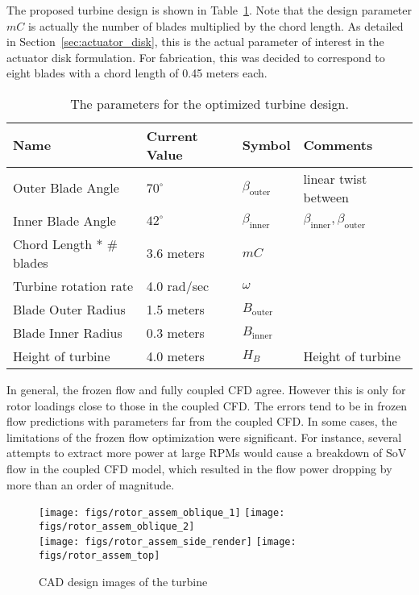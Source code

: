 The proposed turbine design is shown in Table~\ref{tab:turbine}. Note
that the design parameter $mC $ is actually the number of blades
multiplied by the chord length. As detailed in
Section~\ref{sec:actuator_disk}, this is the actual parameter of
interest in the actuator disk formulation. For fabrication, this was
decided to correspond to eight blades with a chord length of 0.45 meters
each.  

\begin{table}[]
\centering
 \caption{The parameters for the optimized turbine design.}
\begin{tabular}{l|l|l|l}
Name                & Current Value    & Symbol           & Comments \\
 \hline
Outer Blade Angle & $70^{\circ}$ & $\beta_{\text{outer}}$  & linear twist between \\
Inner Blade Angle & $42^{\circ}$ & $\beta_\text{inner}$    & 
	     $\beta_\text{inner},\beta_\text{outer}$ \\ 
Chord Length * \# blades   & 3.6 meters  & $mC $ &  \\
Turbine rotation rate & 4.0 rad/sec  & $\omega$         &  \\
Blade Outer Radius  & 1.5 meters   & $B_\text{outer}$ &  \\
Blade Inner Radius  & 0.3 meters   & $B_\text{inner}$ &  \\
Height of turbine   & 4.0 meters   & $H_B$            & Height of turbine \\
\hline
\end{tabular}
 \label{tab:turbine}
\end{table}

In general, the frozen flow and fully coupled CFD agree. However this is
only for rotor loadings close to those in the coupled CFD. The errors
tend to be in frozen flow predictions with parameters far from the
coupled CFD. In some cases, the limitations of the frozen flow
optimization were significant. For instance, several attempts
to extract more power at large RPMs would cause a breakdown of SoV
flow in the coupled CFD model, which resulted in the flow power dropping
by more than an order of magnitude.

  \begin{figure}
   \centering
   \texttt{[image: figs/rotor\_assem\_oblique\_1]}
   \hfill
   \texttt{[image: figs/rotor\_assem\_oblique\_2]}
   \\
   \vspace{1em}
   \texttt{[image: figs/rotor\_assem\_side\_render]}
   \hfill
   \texttt{[image: figs/rotor\_assem\_top]}
   \\   
   \caption{CAD design images of the turbine} 
   \label{fig:cad_turbine}
  \end{figure}


